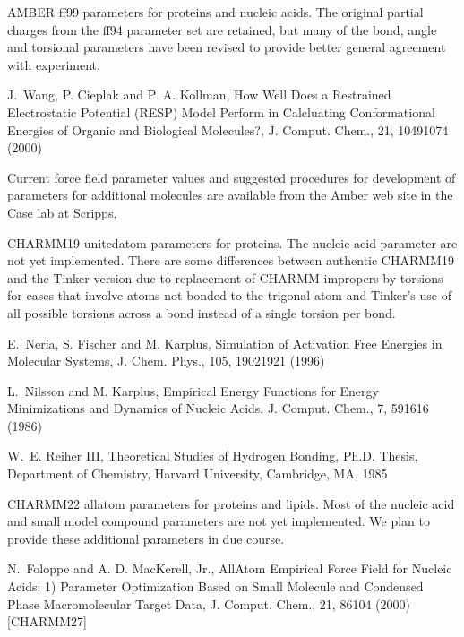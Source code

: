 \documentclass[letterpaper,11pt,english]{sphinxmanual}
\begin{document}

AMBER ff99 parameters for proteins and nucleic acids. The original partial charges from the ff94 parameter set are retained, but many of the bond, angle and torsional parameters have been revised to provide better general agreement with experiment.

J. Wang, P. Cieplak and P. A. Kollman, How Well Does a Restrained Electrostatic Potential (RESP) Model Perform in Calcluating Conformational Energies of Organic and Biological Molecules?, J. Comput. Chem., 21, 1049\sphinxhyphen{}1074 (2000)

Current force field parameter values and suggested procedures for development of parameters for additional molecules are available from the Amber web site in the Case lab at Scripps, 


CHARMM19 united\sphinxhyphen{}atom parameters for proteins. The nucleic acid parameter are not yet implemented. There are some differences between authentic CHARMM19 and the Tinker version due to replacement of CHARMM impropers by torsions for cases that involve atoms not bonded to the trigonal atom and Tinker’s use of all possible torsions across a bond instead of a single torsion per bond.

E. Neria, S. Fischer and M. Karplus, Simulation of Activation Free Energies in Molecular Systems, J. Chem. Phys., 105, 1902\sphinxhyphen{}1921 (1996)

L. Nilsson and M. Karplus, Empirical Energy Functions for Energy Minimizations and Dynamics of Nucleic Acids, J. Comput. Chem., 7, 591\sphinxhyphen{}616 (1986)

W. E. Reiher III, Theoretical Studies of Hydrogen Bonding, Ph.D. Thesis, Department of Chemistry, Harvard University, Cambridge, MA, 1985


CHARMM22 all\sphinxhyphen{}atom parameters for proteins and lipids. Most of the nucleic acid and small model compound parameters are not yet implemented. We plan to provide these additional parameters in due course.

N. Foloppe and A. D. MacKerell, Jr., All\sphinxhyphen{}Atom Empirical Force Field for Nucleic Acids: 1) Parameter Optimization Based on Small Molecule and Condensed Phase Macromolecular Target Data, J. Comput. Chem., 21, 86\sphinxhyphen{}104 (2000)  {[}CHARMM27{]}
\end{document}
